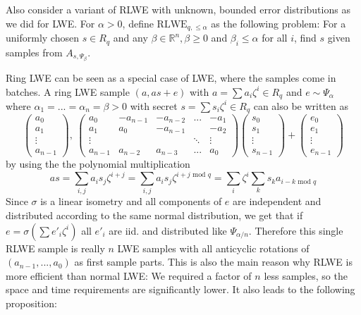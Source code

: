 \documentclass{report}
\newcommand{\R}{\mathbb{R}}
\renewcommand{\mod}{\text{ mod }}
\begin{document}
Also consider a variant of RLWE with unknown, bounded error distributions as we did for LWE. For $\alpha > 0$, define $\mathrm{RLWE}_{q, \leq \alpha}$ as the following problem: For a uniformly chosen $s \in R_q$ and any $\beta \in \R^n, \beta \geq 0$ and $\beta_i \leq \alpha$ for all $i$, find $s$ given samples from $A_{s, \Psi_\beta}$.

\label{connection_rlwe_lwe}
Ring LWE can be seen as a special case of LWE, where the samples come in batches. A ring LWE sample $(a, as + e)$ with $a = \sum a_i \zeta^i \in R_q$ and $e \sim \Psi_\alpha$ where $\alpha_1 = ... = \alpha_n = \beta > 0$ with secret $s = \sum s_i \zeta^i \in R_q$ can also be written as
\begin{equation}
\begin{pmatrix} a_0 \\ a_1 \\ \vdots \\ a_{n - 1} \end{pmatrix}
, \
\begin{pmatrix}
a_0 & -a_{n - 1} & -a_{n - 2} & ... & -a_1 \\
a_1 & a_0 & -a_{n - 1} &  & -a_2 \\
\vdots & & & \ddots & \vdots \\
a_{n - 1} & a_{n - 2} & a_{n - 3} & ...& a_0
\end{pmatrix}
\begin{pmatrix} s_0 \\ s_1 \\ \vdots \\ s_{n - 1} \end{pmatrix}
+
\begin{pmatrix} e_0 \\ e_1 \\ \vdots \\ e_{n - 1} \end{pmatrix} 
\nonumber
\end{equation}
by using the the polynomial multiplication
\begin{equation}
as = \sum_{i, j} a_i s_j \zeta^{i + j} = \sum_{i, j} a_i s_j \zeta^{i + j \mod q} = \sum_i \zeta^i \sum_k s_k a_{i - k \mod q} \nonumber
\end{equation}
Since $\sigma$ is a linear isometry and all components of $e$ are independent and distributed according to the same normal distribution, we get that if $e = \sigma\left(\sum e'_i \zeta^i \right)$ all $e'_i$ are iid. and distributed like $\Psi_{\alpha / n}$. Therefore this single RLWE sample is really $n$ LWE samples with all anticyclic rotations of $(a_{n - 1}, ..., a_0)$ as first sample parts. This is also the main reason why RLWE is more efficient than normal LWE: We required a factor of $n$ less samples, so the space and time requirements are significantly lower. It also leads to the following proposition:
\end{document}

